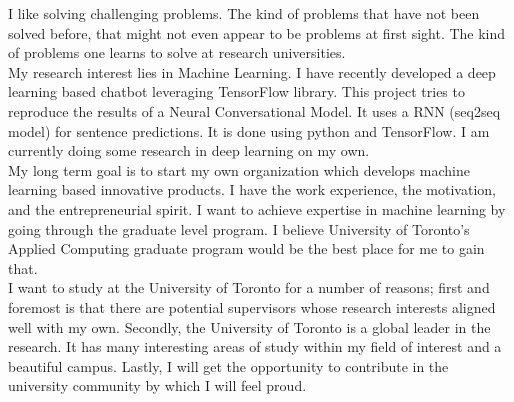 \documentclass{article}
\begin{document}
I like solving challenging problems. The kind of problems that have not been solved before, that might not even appear to be problems at first sight. The kind of problems one learns to solve at research universities.\\

My research interest lies in Machine Learning. I have recently developed a deep learning based chatbot leveraging TensorFlow library. This project tries to reproduce the results of a Neural Conversational Model. It uses a RNN (seq2seq model) for sentence predictions. It is done using python and TensorFlow. I am currently doing some research in deep learning on my own.\\

My long term goal is to start my own organization which develops machine learning based innovative products. I have the work experience, the motivation, and the entrepreneurial spirit. I want to achieve expertise in machine learning by going through the graduate level program. I believe University of Toronto’s Applied Computing graduate program would be the best place for me to gain that.\\

I want to study at the University of Toronto for a number of reasons; first and foremost is that there are potential supervisors whose research interests aligned well with my own. Secondly, the University of Toronto is a global leader in the research. It has many interesting areas of study within my field of interest and a beautiful campus. Lastly, I will get the opportunity to contribute in the university community by which I will feel proud.  
  
\end{document}
